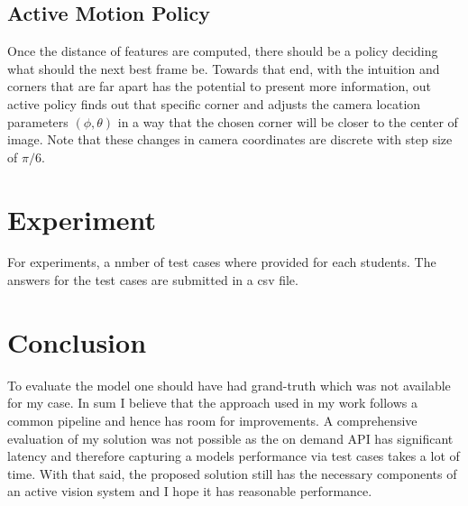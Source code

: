 \documentclass[crop=false]{standalone}
\begin{document}
\subsection{Active Motion Policy}
Once the distance of features are computed, there should be a policy deciding what should the next best frame be. Towards that end, with the intuition and corners that are far apart has the potential to present more information, out active policy finds out that specific corner and adjusts the camera location parameters $(\phi, \theta)$ in a way that the chosen corner will be closer to the center of image. Note that these changes in camera coordinates are discrete with step size of $\pi/6$.

\section{Experiment}
For experiments, a nmber of test cases where provided for each students. The answers for the test cases are submitted in a csv file.

\section{Conclusion}
To evaluate the model one should have had grand-truth which was not available for my case. In sum I believe that the approach used in my work follows a common pipeline and hence has room for improvements. A comprehensive evaluation of my solution was not possible as the on demand API has significant latency and therefore capturing a models performance via test cases takes a lot of time. With that said, the proposed solution still has the necessary components of an active vision system and I hope it has reasonable performance.

\end{document}
